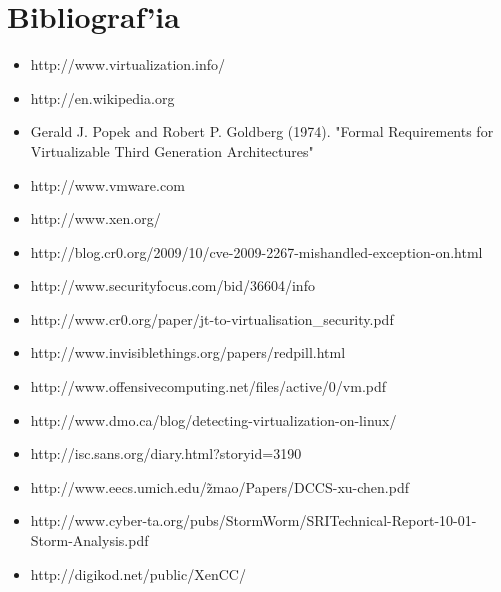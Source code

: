 \section{Bibliograf'ia}

\begin{itemize}
	\item http://www.virtualization.info/
	\item http://en.wikipedia.org
	\item Gerald J. Popek and Robert P. Goldberg (1974). "Formal Requirements for Virtualizable Third Generation Architectures"
	\item http://www.vmware.com
	\item http://www.xen.org/
	\item http://blog.cr0.org/2009/10/cve-2009-2267-mishandled-exception-on.html
	\item http://www.securityfocus.com/bid/36604/info
	\item http://www.cr0.org/paper/jt-to-virtualisation\_security.pdf
	\item http://www.invisiblethings.org/papers/redpill.html
	\item http://www.offensivecomputing.net/files/active/0/vm.pdf
	\item http://www.dmo.ca/blog/detecting-virtualization-on-linux/
	\item http://isc.sans.org/diary.html?storyid=3190
	\item http://www.eecs.umich.edu/\~zmao/Papers/DCCS-xu-chen.pdf
	\item http://www.cyber-ta.org/pubs/StormWorm/SRITechnical-Report-10-01-Storm-Analysis.pdf
	\item http://digikod.net/public/XenCC/
\end{itemize}